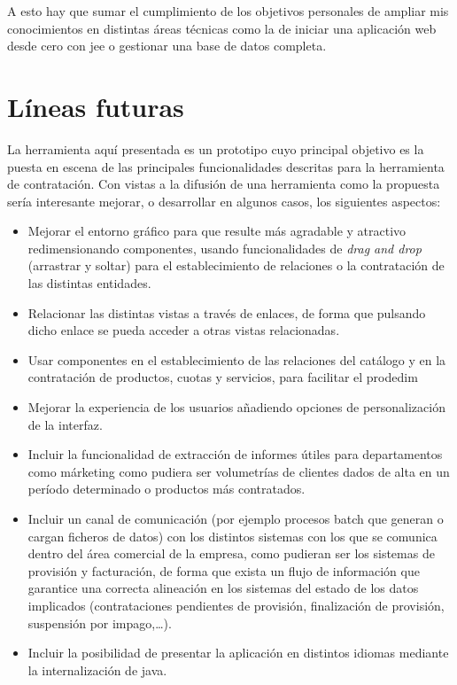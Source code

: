 A esto hay que sumar el cumplimiento de los objetivos personales de ampliar mis conocimientos en distintas áreas técnicas como la de iniciar una aplicación web desde cero con \acrshort{jee} o gestionar una base de datos completa.



\section{Líneas futuras}
\label{sec:futuro}

La herramienta aquí presentada es un prototipo cuyo principal objetivo es la puesta en escena de las principales funcionalidades descritas para la herramienta de contratación. Con vistas a la difusión de una herramienta como la propuesta sería interesante mejorar, o desarrollar en algunos casos, los siguientes aspectos:
\begin{itemize}
\item Mejorar el entorno gráfico para que resulte más agradable y atractivo redimensionando componentes, usando funcionalidades de \textit{drag and drop} (arrastrar y soltar) para el establecimiento de relaciones o la contratación de las distintas entidades.
\item Relacionar las distintas vistas a través de enlaces, de forma que pulsando dicho enlace se pueda acceder a otras vistas relacionadas.
\item Usar componentes en el establecimiento de las relaciones del catálogo y en la contratación de productos, cuotas y servicios, para facilitar el prodedim
\item Mejorar la experiencia de los usuarios añadiendo opciones de personalización de la interfaz.
\item Incluir la funcionalidad de extracción de informes útiles para departamentos como márketing como pudiera ser volumetrías de clientes dados de alta en un período determinado o productos más contratados.
\item Incluir un canal de comunicación (por ejemplo procesos batch que generan o cargan ficheros de datos) con los distintos sistemas con los que se comunica dentro del área comercial de la empresa, como pudieran ser los sistemas de provisión y facturación, de forma que exista un flujo de información que garantice una correcta alineación en los sistemas del estado de los datos implicados (contrataciones pendientes de provisión, finalización de provisión, suspensión por impago,\dots).
\item Incluir la posibilidad de presentar la aplicación en distintos idiomas mediante la internalización de java.
\end{itemize}
